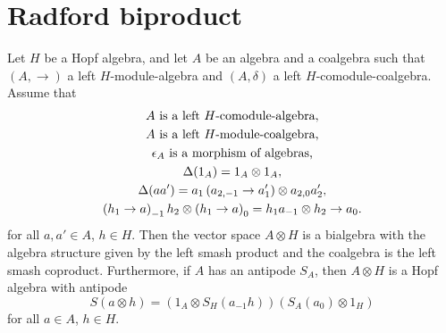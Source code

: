\documentclass[12pt]{amsproc}
\begin{document}


\section{Radford biproduct}


\begin{theorem}[Radford]
\label{theorem:radford}
Let $H$ be a Hopf algebra, and let $A$ be an algebra and a coalgebra such that
$(A,\rightarrow)$ a left $H$-module-algebra and $(A,\delta)$ a left
$H$-comodule-coalgebra.  Assume that 
\begin{gather}
A\text{ is a left \ensuremath{H}-comodule-algebra},\label{eq:radford_1}\\
A\text{ is a left \ensuremath{H}-module-coalgebra,}\label{eq:radford_2}\\
\epsilon_{A}\text{ is a morphism of algebras,}\label{eq:radford_3}\\
\Delta(1_{A})=1_{A}\otimes1_{A},\label{eq:radford_4}\\
\Delta(aa')=a_{1}\left(a_{2,-1}\rightarrow a'_{1}\right)\otimes a_{2,0}a'_{2},\label{eq:radford_5}\\
\left(h_{1}\rightarrow a\right)_{-1}h_{2}\otimes\left(h_{1}\rightarrow a\right)_{0}=h_{1}a_{-1}\otimes h_{2}\rightarrow a_{0}.\label{eq:radford_6}
\end{gather}
for all $a,a'\in A$, $h\in H$.
Then the vector space $A\otimes H$ is a bialgebra with the algebra structure
given by the left smash product and the coalgebra is the left smash coproduct.
Furthermore, if $A$ has an antipode $S_A$, then $A\otimes H$ is a Hopf algebra
with antipode
\[
S(a\otimes h)=(1_A\otimes S_{H}(a_{-1}h))(S_{A}(a_{0})\otimes1_H)
\]
for all $a\in A$, $h\in H$.
\end{theorem}
\end{document}

